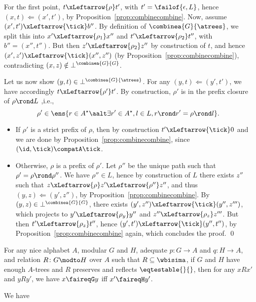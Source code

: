 \documentclass{LMCS}
\theoremstyle{plain}\newtheorem{satz}[thm]{Satz}
\begin{document}
  For the first point, $t \xLeftarrow{\rho} t'$, with $t' =
  \failof{\epsilon,L}$, hence $(x,t) \Leftarrow (x',t')$, by
  Proposition~\ref{prop:combinecombine}.  Now, assume $(x',t')
  \xLeftarrow{\tick} b''$.  By definition of $\combinea{G}{\atrees}$,
  we split this into $x' \xLeftarrow{\rho_1} x''$ and $t'
  \xLeftarrow{\rho_2} t''$, with $b'' = (x'',t'')$. But then $z'
  \xLeftarrow{\rho_2} z''$ by construction of $t$, and hence $(x',z')
  \xLeftarrow{\tick} (x'',z'')$ (by
  Proposition~\ref{prop:combinecombine}), contradicting $(x,z) \notin
  \bot^{\combinea{G}{G}}$.

  Let us now show $(y,t) \in \bot^{\combinea{G}{\atrees}}$.  For any
  $(y,t) \Leftarrow (y',t')$, we have accordingly $t
  \xLeftarrow{\rho'} t'$. 
  By construction, $\rho'$ is in the prefix closure of $\rho \rond L$ ,i.e.,
  $$\rho' \in \ens{r \in A^\star \aalt \exists r' \in A^\star, l \in L, r \rond r' = \rho \rond l}.$$
\begin{itemize}
\item If $\rho'$ is a strict prefix of $\rho$, then by construction $t'
  \xLeftarrow{\tick} 0$ and we are done by
  Proposition~\ref{prop:combinecombine}, since $(\id,\tick) \compatA
  \tick$.
\item Otherwise, $\rho$ is a prefix of $\rho'$. Let $\rho''$ be the unique path such
  that $\rho' = \rho \rond \rho''$.  We have $\rho'' \in L$,
  hence by construction of $L$ there exists $z''$ such that $z
  \xLeftarrow{\rho} z' \xLeftarrow{\rho''} z''$, and thus $(y,z)
  \Leftarrow (y',z'')$, by Proposition~\ref{prop:combinecombine}. By
  $(y,z) \in \bot^{\combinea{G}{G}}$, there exists $(y',z'')
  \xLeftarrow{\tick} (y'',z''')$, which projects to $y'
  \xLeftarrow{\rho_y} y''$ and $z'' \xLeftarrow{\rho_z} z'''$.  But
  then $t' \xLeftarrow{\rho_z} t''$, hence $(y',t') \xLeftarrow{\tick}
  (y'',t'')$, by Proposition~\ref{prop:combinecombine} again, which
  concludes the proof. \qed
\end{itemize}


\begin{cor}\label{cor:wbisim:fair}
  For any nice alphabet $A$, modular $G$ and $H$, adequate $p \colon G
  \to A$ and $q \colon H \to A$, and relation $R \colon G \modto H$
  over $A$ such that $R \subseteq {\wbisima}$, if $G$ and $H$ have
  enough $A$-trees and $R$ preserves and reflects $\eqtestable{}{}$,
  then for any $x R x'$ and $y R y'$, we have ${x \faireqG y}$ iff $x'
  \faireqH y'$.
\end{cor}
\proof
  We have
\end{document}

